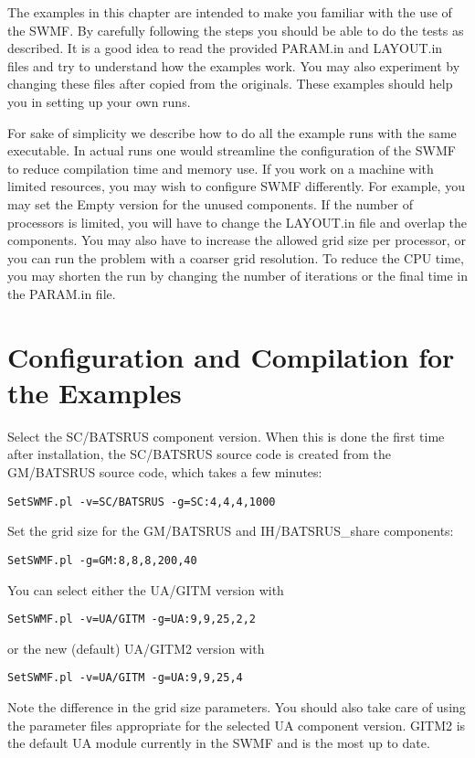 The examples in this chapter are intended to make you familiar
with the use of the SWMF. By carefully following the steps you should
be able to do the tests as described. It is a good idea to read the
provided PARAM.in and LAYOUT.in files and try to understand how
the examples work. You may also experiment by changing these files
after copied from the originals. These examples should help you
in setting up your own runs.

For sake of simplicity we describe how to do all the example runs with the
same executable. In actual runs one would streamline the configuration
of the SWMF to reduce compilation time and memory use. If you work
on a machine with limited resources, you may wish to configure SWMF
differently. For example, you may set the Empty version for the unused
components. If the number of processors is limited, you will have to
change the LAYOUT.in file and overlap the components. You may also have to 
increase the allowed grid size per processor, or you can run the problem with 
a coarser grid resolution. To reduce the CPU time, you may shorten the 
run by changing the number of iterations or the final time in the 
PARAM.in file.

\section{Configuration and Compilation for the Examples}

Select the SC/BATSRUS component version. When this is done the first time
after installation, the SC/BATSRUS source code is created from the GM/BATSRUS
source code, which takes a few minutes:
\begin{verbatim}
SetSWMF.pl -v=SC/BATSRUS -g=SC:4,4,4,1000
\end{verbatim}
Set the grid size for the GM/BATSRUS and IH/BATSRUS\_share components:
\begin{verbatim}
SetSWMF.pl -g=GM:8,8,8,200,40
\end{verbatim}
You can select either the UA/GITM version with
\begin{verbatim}
SetSWMF.pl -v=UA/GITM -g=UA:9,9,25,2,2
\end{verbatim}
or the new (default) UA/GITM2 version with
\begin{verbatim}
SetSWMF.pl -v=UA/GITM -g=UA:9,9,25,4
\end{verbatim}
Note the difference in the grid size parameters.
You should also take care of using the parameter files appropriate for
the selected UA component version.  GITM2 is the default UA module
currently in the SWMF and is the most up to date.

